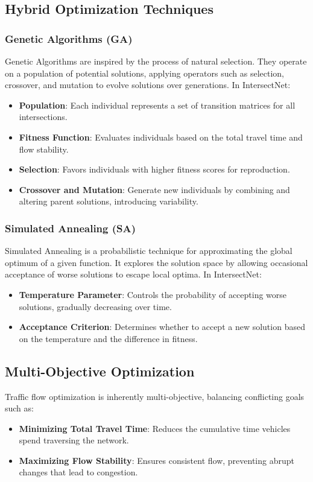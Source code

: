 \documentclass[conference]{IEEEtran}
\begin{document}
\subsection{Hybrid Optimization Techniques}
\subsubsection{Genetic Algorithms (GA)}
Genetic Algorithms are inspired by the process of natural selection. They operate on a population of potential solutions, applying operators such as selection, crossover, and mutation to evolve solutions over generations. In IntersectNet:
\begin{itemize}
    \item \textbf{Population}: Each individual represents a set of transition matrices for all intersections.
    \item \textbf{Fitness Function}: Evaluates individuals based on the total travel time and flow stability.
    \item \textbf{Selection}: Favors individuals with higher fitness scores for reproduction.
    \item \textbf{Crossover and Mutation}: Generate new individuals by combining and altering parent solutions, introducing variability.
\end{itemize}

\subsubsection{Simulated Annealing (SA)}
Simulated Annealing is a probabilistic technique for approximating the global optimum of a given function. It explores the solution space by allowing occasional acceptance of worse solutions to escape local optima. In IntersectNet:
\begin{itemize}
    \item \textbf{Temperature Parameter}: Controls the probability of accepting worse solutions, gradually decreasing over time.
    \item \textbf{Acceptance Criterion}: Determines whether to accept a new solution based on the temperature and the difference in fitness.
\end{itemize}

\subsection{Multi-Objective Optimization}
Traffic flow optimization is inherently multi-objective, balancing conflicting goals such as:
\begin{itemize}
    \item \textbf{Minimizing Total Travel Time}: Reduces the cumulative time vehicles spend traversing the network.
    \item \textbf{Maximizing Flow Stability}: Ensures consistent flow, preventing abrupt changes that lead to congestion.
\end{itemize}
\end{document}
